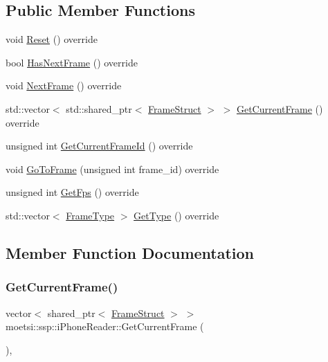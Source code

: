 \subsection*{Public Member Functions}
\begin{DoxyCompactItemize}
\item 
void \hyperlink{classmoetsi_1_1ssp_1_1iPhoneReader_a3d78eacce7d71483da93efde29f47241}{Reset} () override
\item 
bool \hyperlink{classmoetsi_1_1ssp_1_1iPhoneReader_a35ca55a03a9fb7b559f9381b11f53bfe}{Has\+Next\+Frame} () override
\item 
void \hyperlink{classmoetsi_1_1ssp_1_1iPhoneReader_abba4479843de3e7ab42a3116b9fa94c9}{Next\+Frame} () override
\item 
std\+::vector$<$ std\+::shared\+\_\+ptr$<$ \hyperlink{structmoetsi_1_1ssp_1_1FrameStruct}{Frame\+Struct} $>$ $>$ \hyperlink{classmoetsi_1_1ssp_1_1iPhoneReader_ad3b35cece8ba5b53edb110b5c1aa80bc}{Get\+Current\+Frame} () override
\item 
unsigned int \hyperlink{classmoetsi_1_1ssp_1_1iPhoneReader_a78792c6319743aed3ef2afc96fe16485}{Get\+Current\+Frame\+Id} () override
\item 
void \hyperlink{classmoetsi_1_1ssp_1_1iPhoneReader_a27b6dea97e4c4db8e4e749cc9e30e7ca}{Go\+To\+Frame} (unsigned int frame\+\_\+id) override
\item 
unsigned int \hyperlink{classmoetsi_1_1ssp_1_1iPhoneReader_a4bb216847a6c2ed8eb5d31788a0b8477}{Get\+Fps} () override
\item 
std\+::vector$<$ \hyperlink{namespacemoetsi_1_1ssp_a46efdfa2cd5a28ead465dcc8006b5a87}{Frame\+Type} $>$ \hyperlink{classmoetsi_1_1ssp_1_1iPhoneReader_a05d285ace85fc570bc2f453a0862ae56}{Get\+Type} () override
\end{DoxyCompactItemize}


\subsection{Member Function Documentation}
\mbox{\label{classmoetsi_1_1ssp_1_1iPhoneReader_ad3b35cece8ba5b53edb110b5c1aa80bc}} 
\subsubsection{\texorpdfstring{Get\+Current\+Frame()}{GetCurrentFrame()}}
{\footnotesize\ttfamily vector$<$ shared\+\_\+ptr$<$ \hyperlink{structmoetsi_1_1ssp_1_1FrameStruct}{Frame\+Struct} $>$ $>$ moetsi\+::ssp\+::i\+Phone\+Reader\+::\+Get\+Current\+Frame (\begin{DoxyParamCaption}{ }\end{DoxyParamCaption})\hspace{0.3cm}{\ttfamily [override]}, {\ttfamily [virtual]}}

